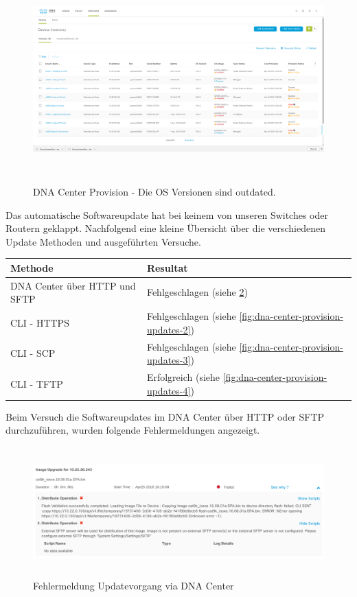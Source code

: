 \begin{figure}[H]
	\centering
	\includegraphics[height=8cm]{img/updates/Selection_070.png}
	\caption{DNA Center Provision - Die OS Versionen sind outdated.}
	\label{fig:dna-center-provision-updates}
\end{figure}

Das automatische Softwareupdate hat bei keinem von unseren Switches oder Routern geklappt. Nachfolgend eine kleine Übersicht über die verschiedenen Update Methoden und ausgeführten Versuche.

\begin{table}[H]
	\centering
	\begin{tabular}{ | l | l |}
	\hline
	\rowcolor{gray!50}
	\textbf{Methode} & \textbf{Resultat} \\
	\hline	
	\makecell
	{DNA Center über HTTP und SFTP} & Fehlgeschlagen (siehe \ref{fig:dna-center-provision-updates-1}) \\
	\hline
	CLI - HTTPS    & Fehlgeschlagen (siehe \ref{fig:dna-center-provision-updates-2}) \\
	\hline
	CLI - SCP      & Fehlgeschlagen (siehe \ref{fig:dna-center-provision-updates-3}) \\
	\hline
	CLI - TFTP     & Erfolgreich (siehe \ref{fig:dna-center-provision-updates-4}) \\	
	\hline
	\end{tabular}
\end{table}

Beim Versuch die Softwareupdates im DNA Center über HTTP oder SFTP durchzuführen, wurden folgende Fehlermeldungen angezeigt.

\begin{figure}[H]
	\centering
	\includegraphics[height=5cm]{img/updates/Selection_071.png}
	\caption{Fehlermeldung Updatevorgang via DNA Center}
	\label{fig:dna-center-provision-updates-1}
\end{figure}


